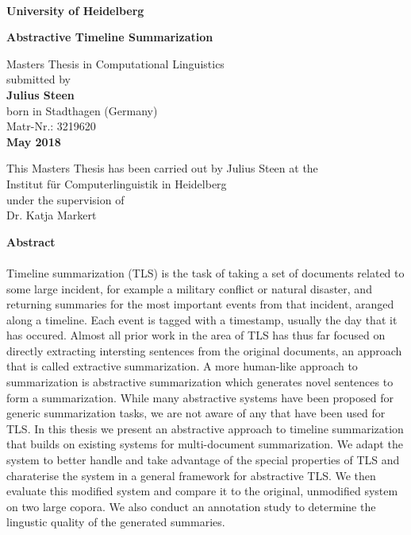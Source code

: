 \documentclass[a4paper,BCOR=10mm]{report}
\numberwithin{lemma}{chapter}
\numberwithin{definition}{chapter}
\begin{document}
\begin{titlepage}
\begin{center}
 
\Large\textbf{\\
University of Heidelberg}
\vspace{2cm}

\Huge\textbf{
Abstractive Timeline Summarization
}

\vspace{10cm}

\normalsize
Masters Thesis in Computational Linguistics\\
submitted by\\
\vspace{0.5cm}
\Large\textbf{Julius Steen}\\
\normalsize
\vspace{0.5cm}
born in Stadthagen (Germany)\\
\normalsize
Matr-Nr.: 3219620 \\
\vspace{0.5cm}
\Large\textbf{May 2018} \\
\normalsize

\newpage

\normalsize
This Masters Thesis has been carried out by Julius Steen at the\\
Institut für Computerlinguistik in Heidelberg\\
under the supervision of\\
Dr. Katja Markert
\vfill
\end{center}

\newpage
\noindent
\Large\textbf{Abstract}\\
\\

Timeline summarization (TLS) is the task of taking a set of documents related to some large incident, for example a military conflict or natural disaster, and returning summaries for the most important events from that incident, aranged along a timeline. Each event is tagged with a timestamp, usually the day that it has occured.
Almost all prior work in the area of TLS has thus far focused on directly extracting intersting sentences from the original documents, an approach that is called extractive summarization. A more human-like approach to summarization is abstractive summarization which generates novel sentences to form a summarization. While many abstractive systems have been proposed for generic summarization tasks, we are not aware of any that have been used for TLS.
In this thesis we present an abstractive approach to timeline summarization that builds on existing systems for multi-document summarization. We adapt the system to better handle and take advantage of the special properties of TLS and charaterise the system in a general framework for abstractive TLS. We then evaluate this modified system and compare it to the original, unmodified system on two large copora.
We also conduct an annotation study to determine the lingustic quality of the generated summaries.



\end{titlepage}
\end{document}
